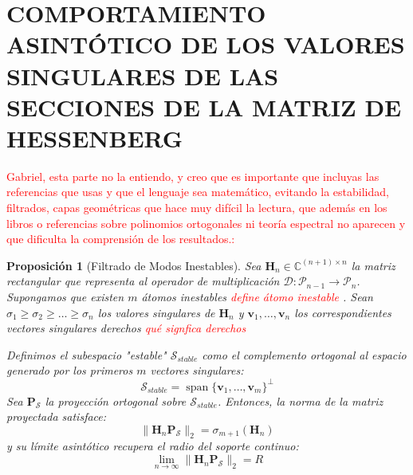 \documentclass[12pt,a4paper]{article}
\newtheorem{proposicion}{Proposición}
\begin{document}
\section{COMPORTAMIENTO ASINTÓTICO DE LOS VALORES SINGULARES DE LAS SECCIONES DE LA MATRIZ DE HESSENBERG}

\textcolor{red}{Gabriel, esta parte no la entiendo, y creo que es importante que incluyas las referencias que usas y que el lenguaje sea matemático, evitando la estabilidad, filtrados, capas geométricas que hace muy difícil la lectura, que además en los libros o referencias sobre polinomios ortogonales ni teoría espectral no aparecen y que dificulta la  comprensión de los resultados.: }
\begin{proposicion}[Filtrado de Modos Inestables]
Sea $\mathbf{H}_n \in \mathbb{C}^{(n+1) \times n}$ la matriz rectangular que representa al operador de multiplicación $\mathcal{D}: \mathcal{P}_{n-1} \to \mathcal{P}_n$.
Supongamos que existen $m$ átomos inestables \textcolor{red}{define átomo inestable}  . Sean $\sigma_1 \ge \sigma_2 \ge \dots \ge \sigma_n$ los valores singulares de $\mathbf{H}_n$ y $\mathbf{v}_1, \dots, \mathbf{v}_n$ los correspondientes vectores singulares derechos \textcolor{red}{qué signfica derechos}


Definimos el subespacio "estable" $\mathcal{S}_{stable}$ como el complemento ortogonal al espacio generado por los primeros $m$ vectores singulares:
\begin{equation}
    \mathcal{S}_{stable} = \operatorname{span}\{\mathbf{v}_1, \dots, \mathbf{v}_m\}^\perp
\end{equation}
Sea $\mathbf{P}_{\mathcal{S}}$ la proyección ortogonal sobre $\mathcal{S}_{stable}$. Entonces, la norma de la matriz proyectada satisface:
\begin{equation}
    \|\mathbf{H}_n \mathbf{P}_{\mathcal{S}}\|_2 = \sigma_{m+1}(\mathbf{H}_n)
\end{equation}
y su límite asintótico recupera el radio del soporte continuo:
\begin{equation}
    \lim_{n \to \infty} \|\mathbf{H}_n \mathbf{P}_{\mathcal{S}}\|_2 = R
\end{equation}
\end{proposicion}
\end{document}
